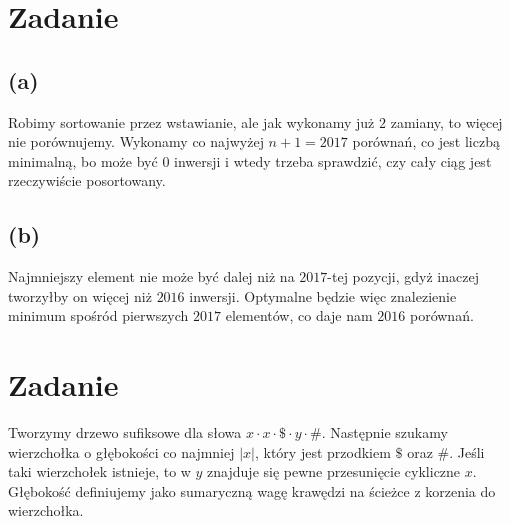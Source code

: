 \documentclass[12pt, a4paper]{article}
\newcounter{zadanie}
\newcommand{\zadanie}{\addtocounter{zadanie}{1}\section*{Zadanie \arabic{zadanie}}}
\begin{document}
\zadanie{}
\subsection*{(a)}
Robimy sortowanie przez wstawianie, ale jak wykonamy już $2$ zamiany, to więcej
nie porównujemy. Wykonamy co najwyżej $n + 1 = 2017$ porównań, co jest liczbą
minimalną, bo może być $0$ inwersji i wtedy trzeba sprawdzić, czy cały ciąg
jest rzeczywiście posortowany.

\subsection*{(b)}
Najmniejszy element nie może być dalej niż na $2017$-tej pozycji, gdyż inaczej
tworzyłby on więcej niż $2016$ inwersji. Optymalne będzie więc znalezienie
minimum spośród pierwszych $2017$ elementów, co daje nam $2016$ porównań.

\zadanie{}
Tworzymy drzewo sufiksowe dla słowa $x \cdot x \cdot \$ \cdot y \cdot \#$.
Następnie szukamy wierzchołka o głębokości co najmniej $|x|$, który jest przodkiem $\$$
oraz $\#$. Jeśli taki wierzchołek istnieje, to w $y$ znajduje się pewne
przesunięcie cykliczne $x$. Głębokość definiujemy jako sumaryczną wagę krawędzi
na ścieżce z korzenia do wierzchołka.
\end{document}
